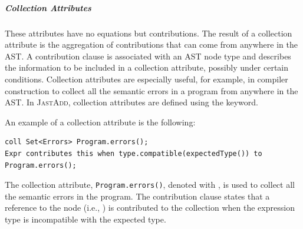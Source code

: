     \subparagraph*{Collection Attributes} These attributes have no equations but contributions. The
    result of a collection attribute is the aggregation of contributions that can
    come from anywhere in the AST. A contribution clause is associated with
    an AST node type and describes the information to be included in a collection
    attribute, possibly under certain conditions. Collection attributes are especially
    useful, for example, in compiler construction to collect all the semantic errors in a program
    from anywhere in the AST. In \textsc{JastAdd}, collection attributes are defined using the
     keyword.

    An example of a collection attribute is the following:
    \begin{lstlisting}[language=JastAdd]
coll Set<Errors> Program.errors();
Expr contributes this when type.compatible(expectedType()) to Program.errors();
    \end{lstlisting}
    The collection attribute, \texttt{Program.errors()}, denoted with ,
    is used to collect all the semantic errors in the program. The contribution clause
    states that a reference to the  node (i.e., ) is contributed to the collection when
    the expression type is incompatible with the expected type.




